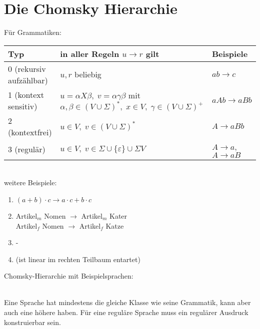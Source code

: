 \documentclass{scrreprt}
\begin{document}
\section{Die Chomsky Hierarchie}
Für Grammatiken:\\
\begin{tabular}{L{0.3} L{0.5} L{0.2}}
Typ & in aller Regeln $u\to r$ gilt & Beispiele\\
 (rekursiv aufzählbar) & $u,r$ beliebig & $ab\to c$\\
1 (kontext sensitiv) & $u=\alpha X \beta, \; v = \alpha \gamma \beta$ mit $\alpha, \beta \in (V\cup \Sigma)^*, \; x \in V, \; \gamma \in (V\cup \Sigma)^+$ & $aAb \to aBb$\\
2 (kontextfrei) & $u \in V, \; v\in (V \cup \Sigma)^*$ & $A \to aBb$\\
3 (regulär) & $u\in V, \; v \in \Sigma \cup \{\varepsilon\} \cup \Sigma V$ & $A \to a$, $A\to aB$
\end{tabular}\\
weitere Beispiele:
\begin{enumerate}[start=0]
\item $(a+b) \cdot c \to a\cdot c + b \cdot c$
\item Artikel$_m$ Nomen $\to$ Artikel$_m$ Kater\\
Artikel$_f$ Nomen $\to$ Artikel$_f$ Katze
\item - 
\item (ist linear im rechten Teilbaum entartet)
\end{enumerate}
Chomsky-Hierarchie mit Beispielsprachen:\\
\\
Eine Sprache hat mindestens die gleiche Klasse wie seine Grammatik, kann aber auch eine höhere haben. Für eine reguläre Sprache muss ein regulärer Ausdruck konstruierbar sein.
\end{document}
